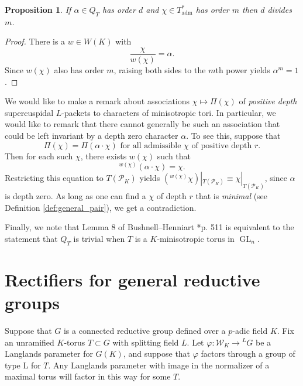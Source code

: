 \documentclass{mrlart7}
\theoremstyle{plain}
\newtheorem{proposition}[theorem]{Proposition}
\theoremstyle{definition}
\numberwithin{equation}{section}
\DeclareMathOperator{\GL}{GL}
\newcommand{\PK}{\mathcal{P}_K}
\newcommand{\Weil}{\mathcal{W}}
\newcommand{\Thadm}{T^*_{\operatorname{adm}}}
\begin{document}
\begin{proposition} \label{orderdiv}
If $\alpha \in Q_T$ has order $d$ and $\chi \in \Thadm$ has order $m$ then $d$ divides $m$.
\end{proposition}
\begin{proof}
There is a $w \in W(K)$ with
$$\frac{\chi}{w(\chi)} = \alpha.$$
Since $w(\chi)$ also has order $m$, raising both sides to the $m$th power  yields $\alpha^m = 1$.
\end{proof}

We would like to make a remark about associations $\chi \mapsto \Pi(\chi)$ of \emph{positive depth}
supercuspidal $L$-packets to characters of minisotropic tori.  In particular, we would like
to remark that there cannot generally be such an association that could be left invariant by a
depth zero character $\alpha$. To see this, suppose that
$$\Pi(\chi) = \Pi(\alpha\cdot\chi) \mbox{ for all admissible $\chi$ of positive depth $r$}.$$
Then for each such $\chi$, there exists $w(\chi)$ such that 
$${}^{w(\chi)} (\alpha \cdot \chi) = \chi.$$
Restricting this equation to $T(\PK)$ yields $({}^{w(\chi)} \chi)|_{T(\PK)} \equiv \chi|_{T(\PK)}$,
since $\alpha$ is depth zero.  As long as one can find a $\chi$ of depth $r$ that is \emph{minimal}
(see Definition \ref{def:general_pair}), we get a contradiction.

Finally, we note that Lemma 8 of Bushnell--Henniart \cite{bushnell-henniart:10a}*{p. 511} is equivalent to
the statement that $Q_T$ is trivial when $T$ is a $K$-minisotropic torus in $\GL_n$.

\section{Rectifiers for general reductive groups} \label{section:general_rectifiers}

Suppose that $G$ is a connected reductive group defined over a
$p$-adic field $K$.  Fix an unramified $K$-torus $T \subset G$ with splitting field $L$.
Let $\varphi : \Weil_K \rightarrow {}^L G$ be a
Langlands parameter for $G(K)$, and suppose that $\varphi$ factors
through a group of type L for $T$.  Any Langlands parameter with image in the normalizer
of a maximal torus will factor in this way for some $T$.
\end{document}
